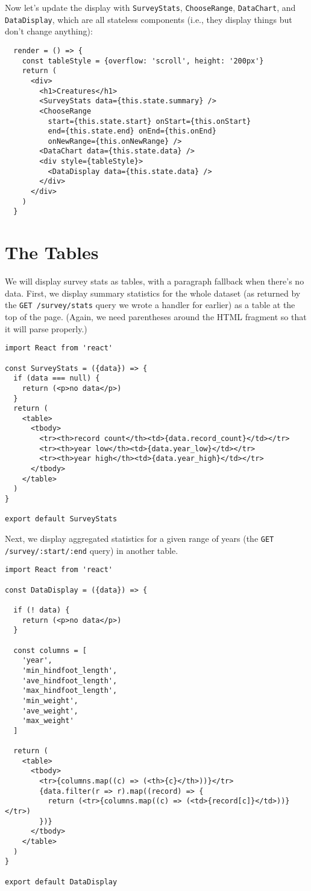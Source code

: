 Now let's update the display with \texttt{SurveyStats},
\texttt{ChooseRange}, \texttt{DataChart}, and \texttt{DataDisplay},
which are all stateless components
(i.e., they display things but don't change anything):

\begin{verbatim}
  render = () => {
    const tableStyle = {overflow: 'scroll', height: '200px'}
    return (
      <div>
        <h1>Creatures</h1>
        <SurveyStats data={this.state.summary} />
        <ChooseRange
          start={this.state.start} onStart={this.onStart}
          end={this.state.end} onEnd={this.onEnd}
          onNewRange={this.onNewRange} />
        <DataChart data={this.state.data} />
        <div style={tableStyle}>
          <DataDisplay data={this.state.data} />
        </div>
      </div>
    )
  }
\end{verbatim}

\section{The Tables}\label{s:capstone-tables}

We will display survey stats as tables,
with a paragraph fallback when there's no data.
First, we display summary statistics for the whole dataset
(as returned by the \texttt{GET /survey/stats} query we wrote a handler for earlier)
as a table at the top of the page.
(Again, we need parentheses around the HTML fragment so that it will parse properly.)

\begin{verbatim}
import React from 'react'

const SurveyStats = ({data}) => {
  if (data === null) {
    return (<p>no data</p>)
  }
  return (
    <table>
      <tbody>
        <tr><th>record count</th><td>{data.record_count}</td></tr>
        <tr><th>year low</th><td>{data.year_low}</td></tr>
        <tr><th>year high</th><td>{data.year_high}</td></tr>
      </tbody>
    </table>
  )
}

export default SurveyStats
\end{verbatim}

Next, we display aggregated statistics for a given range of years
(the \texttt{GET /survey/:start/:end} query)
in another table.

\begin{verbatim}
import React from 'react'

const DataDisplay = ({data}) => {

  if (! data) {
    return (<p>no data</p>)
  }

  const columns = [
    'year',
    'min_hindfoot_length',
    'ave_hindfoot_length',
    'max_hindfoot_length',
    'min_weight',
    'ave_weight',
    'max_weight'
  ]

  return (
    <table>
      <tbody>
        <tr>{columns.map((c) => (<th>{c}</th>))}</tr>
        {data.filter(r => r).map((record) => {
          return (<tr>{columns.map((c) => (<td>{record[c]}</td>))}</tr>)
        })}
      </tbody>
    </table>
  )
}

export default DataDisplay
\end{verbatim}

